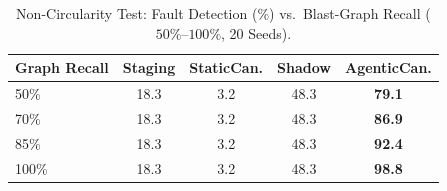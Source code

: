 \begin{table}[t]
\centering
\caption{Non-Circularity Test: Fault Detection (\%) vs.\ Blast-Graph Recall ($50\%$--$100\%$, 20 Seeds).}
\label{tab:acv_recall}
\begin{tabular}{lcccc}
\toprule
\textbf{Graph Recall} & \textbf{Staging} & \textbf{StaticCan.} & \textbf{Shadow} & \textbf{AgenticCan.} \\
\midrule
50\% & 18.3 & 3.2 & 48.3 & \textbf{79.1} \\
70\% & 18.3 & 3.2 & 48.3 & \textbf{86.9} \\
85\% & 18.3 & 3.2 & 48.3 & \textbf{92.4} \\
100\% & 18.3 & 3.2 & 48.3 & \textbf{98.8} \\
\bottomrule
\end{tabular}
\end{table}
